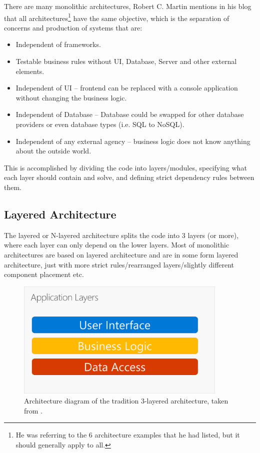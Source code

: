There are many monolithic architectures, Robert C. Martin mentions in his blog \cite{robert_martin:ca_blog} that all architectures\footnote{He was referring to the 6 architecture examples that he had listed, but it should generally apply to all.} have the same objective, which is the separation of concerns and production of systems that are:
\begin{itemize}
    \item Independent of frameworks.
    \item Testable business rules without UI, Database, Server and other external elements.
    \item Independent of UI -- frontend can be replaced with a console application without changing the business logic.
    \item Independent of Database -- Database could be swapped for other database providers or even database types (i.e. SQL to NoSQL).
    \item Independent of any external agency -- business logic does not know anything about the outside world.
\end{itemize}

This is accomplished by dividing the code into layers/modules, specifying what each layer should contain and solve, and defining strict dependency rules between them.

\subsection{Layered Architecture}
\label{theory:layered_architecture}
The layered or N-layered architecture splits the code into 3 layers (or more), where each layer can only depend on the lower layers. Most of monolithic architectures are based on layered architecture and are in some form layered architecture, just with more strict rules/rearranged layers/slightly different component placement etc.

\begin{figure} [H]
    \centering
    \includegraphics[width=0.9\textwidth]{figures/layered-architecture.png}
    \caption{Architecture diagram of the tradition 3-layered architecture, taken from \cite{ms:modern_webapps}.}
    \label{fig:arch:layered_architecture}
\end{figure}

